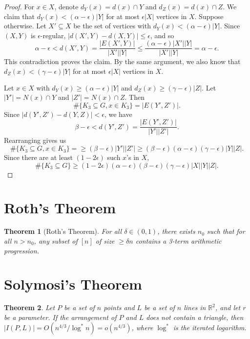 \documentclass[12pt,reqno]{amsart}
\newtheorem{theorem}{Theorem}[section]
\theoremstyle{definition}
\theoremstyle{remark}
\renewcommand{\leq}{\leqslant}
\renewcommand{\geq}{\geqslant}
\def\R{\mathbb{R}}
\numberwithin{equation}{section}
\begin{document}
\begin{proof}
	For $x \in X$, denote $d_Y(x) = d(x) \cap Y$ and $d_Z(x) = d(x) \cap Z$. We claim that $d_Y(x) < (\alpha - \epsilon)|Y|$ for at most $\epsilon|X|$ vertices in $X$. Suppose otherwise. Let $X' \subseteq X$ be the set of vertices with $d_Y(x) < (\alpha - \epsilon)|Y|$. Since $(X, Y)$ is $\epsilon$-regular, $|d(X', Y) - d(X, Y)| \leq \epsilon$, and so
	\[
		\alpha - \epsilon < d(X', Y) = \frac{|E(X', Y)|}{|X'||Y|} \leq \frac{(\alpha - \epsilon)|X'||Y|}{|X'||Y|} = \alpha - \epsilon.
	\]
	This contradiction proves the claim. By the same argument, we also know that $d_Z(x) < (\gamma - \epsilon)|Y|$ for at most $\epsilon|X|$ vertices in $X$.

	Let $x \in X$ with $d_Y(x) \geq (\alpha - \epsilon)|Y|$ and $d_Z(x) \geq (\gamma - \epsilon)|Z|$. Let $|Y'| = N(x) \cap Y$ and $|Z'| = N(x) \cap Z$. Then
	\[
		\#\{K_3 \subseteq G, x \in K_3\} = |E(Y', Z')|.
	\]
	Since $|d(Y', Z') - d(Y, Z)| < \epsilon$, we have 
	\[
		\beta - \epsilon < d(Y', Z') = \frac{|E(Y', Z')|}{|Y'||Z'|}.
	\]
	Rearranging gives us
	\[
		\#\{K_3 \subseteq G, x \in K_3\} = \geq (\beta - \epsilon)|Y'||Z'| \geq (\beta - \epsilon)(\alpha - \epsilon)(\gamma - \epsilon)|Y||Z|.
	\]
	Since there are at least $(1 - 2\epsilon)$ such $x$'s in $X$,
	\[
		\#\{K_3 \subseteq G\} \geq (1 - 2\epsilon)(\alpha - \epsilon)(\beta - \epsilon)(\gamma - \epsilon)|X||Y||Z|.
	\]
\end{proof}

\newpage

\section{Roth's Theorem}

\begin{theorem}[Roth's Theorem]
	For all $\delta \in (0, 1)$, there exists $n_0$ such that for all $n > n_0$, any subset of $[n]$ of size $\geq \delta n$ contains a 3-term arithmetic progression.
\end{theorem}

\newpage

\section{Solymosi's Theorem}

\begin{theorem}
	Let $P$ be a set of $n$ points and $L$ be a set of $n$ lines in $\R^2$, and let $r$ be a parameter. If the arrangement of $P$ and $L$ does not contain a triangle, then $|I(P, L)| = O(n^{4/3}/\log^* n) = o(n^{4/3})$, where $\log^*$ is the iterated logarithm. 
\end{theorem}
\end{document}
